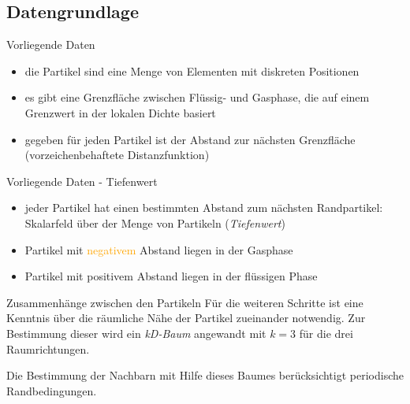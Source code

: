 \documentclass[10pt]{beamer}
\newcommand{\liquid}[1]{\textcolor{blau}{#1}}
\newcommand{\wichtig}[1]{\textit{#1}}
\newcommand{\gas}[1]{\textcolor{orange}{#1}}
\begin{document}
\subsection{Datengrundlage}
\begin{frame}{Vorliegende Daten}
	\begin{itemize}
		\item die Partikel sind eine Menge von Elementen mit diskreten Positionen
		\item es gibt eine Grenzfläche zwischen Flüssig- und Gasphase, die auf einem Grenzwert in der lokalen Dichte basiert
		\item gegeben für jeden Partikel ist der Abstand zur nächsten Grenzfläche (vorzeichenbehaftete Distanzfunktion)
	\end{itemize}
\end{frame}

\begin{frame}{Vorliegende Daten - Tiefenwert}
	\begin{itemize}
		\item jeder Partikel hat einen bestimmten Abstand zum nächsten Randpartikel: Skalarfeld über der Menge von Partikeln (\wichtig{Tiefenwert})
		\item Partikel mit \gas{negativem} Abstand liegen in der Gasphase
		\item Partikel mit \liquid{positivem} Abstand liegen in der flüssigen Phase 
	\end{itemize}
\end{frame}

\begin{frame}{Zusammenhänge zwischen den Partikeln}
	Für die weiteren Schritte ist eine Kenntnis über die räumliche Nähe der Partikel zueinander notwendig. Zur Bestimmung dieser wird ein \wichtig{kD-Baum} angewandt mit $k=3$ für die drei Raumrichtungen.
	
	Die Bestimmung der Nachbarn mit Hilfe dieses Baumes berücksichtigt periodische Randbedingungen.
\end{frame}
\end{document}
